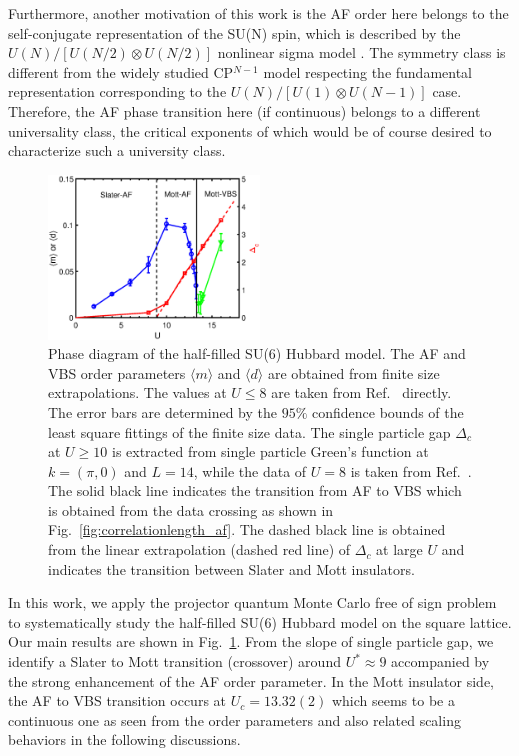 \documentclass[twocolumn,superscriptaddress]{revtex4-1}
\begin{document}
Furthermore, another motivation of this work is the AF order here belongs to the self-conjugate representation of the SU(N) spin, which is described by the $U(N)/[U(N/2)\otimes U(N/2)]$ nonlinear sigma model \cite{MacFarlane_PLB_1979,Duerksen_PRD_1981,Read_PRL_1989,*Read_NPB_1989,*Read_PRB_1990}. The symmetry class is different from the widely studied CP$^{N-1}$ model respecting the fundamental representation corresponding to the $U(N)/[U(1)\otimes U(N-1)]$ case. Therefore, the AF phase transition here (if continuous) belongs to a different universality class, the critical exponents of which would be of course desired to characterize such a university class.

\begin{figure} [h]
    \includegraphics[width=0.5\textwidth]{phasediagram}
    \caption{\label{fig:phasediagram}Phase diagram of the half-filled SU(6) Hubbard model. The AF and VBS order parameters $\langle m \rangle$ and $\langle d \rangle$ are obtained from finite size extrapolations. The values at $U\le8$ are taken from Ref.~ directly. The error bars are determined by the $95\%$ confidence bounds of the least square fittings of the finite size data. The single particle gap $\Delta_c$ at $U\ge10$ is extracted from single particle Green's function at $k=(\pi,0)$ and $L=14$, while the data of $U=8$ is taken from Ref.~. The solid black line indicates the transition from AF to VBS which is obtained from the data crossing as shown in Fig.~\ref{fig:correlationlength_af}. The dashed black line is obtained from the linear extrapolation (dashed red line) of $\Delta_c$ at large $U$ and indicates the transition between Slater and Mott insulators.}
\end{figure}

In this work, we apply the projector quantum Monte Carlo free of sign problem to systematically study the half-filled SU(6) Hubbard model on the square lattice. Our main results are shown in Fig.~\ref{fig:phasediagram}. From the slope of single particle gap, we identify a Slater to Mott transition (crossover) around $U^*\approx9$ accompanied by the strong enhancement of the AF order parameter. In the Mott insulator side, the AF to VBS transition occurs at $U_c=13.32(2)$ which seems to be a continuous one as seen from the order parameters and also related scaling behaviors in the following discussions. 
\end{document}
